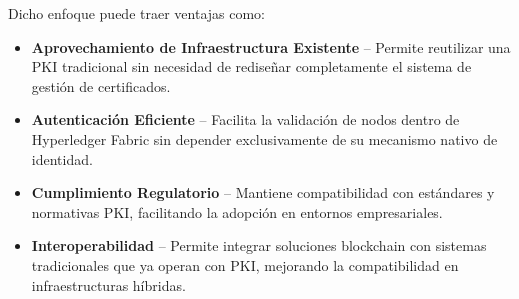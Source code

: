 Dicho enfoque puede traer ventajas como:
\begin{itemize}
  \item \textbf{Aprovechamiento de Infraestructura Existente} – Permite reutilizar una PKI tradicional sin necesidad de rediseñar completamente el sistema de gestión de certificados.
  \item \textbf{Autenticación Eficiente} – Facilita la validación de nodos dentro de Hyperledger Fabric sin depender exclusivamente de su mecanismo nativo de identidad.
  \item \textbf{Cumplimiento Regulatorio} – Mantiene compatibilidad con estándares y normativas PKI, facilitando la adopción en entornos empresariales.
  \item \textbf{Interoperabilidad} – Permite integrar soluciones blockchain con sistemas tradicionales que ya operan con PKI, mejorando la compatibilidad en infraestructuras híbridas.
\end{itemize}
